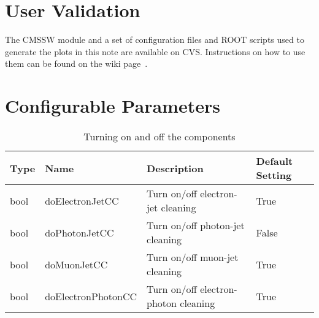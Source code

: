 \documentclass{cmspaper}
\begin{document}

\section{User Validation}
The CMSSW module and a set of configuration files and ROOT scripts used to
generate the plots in this note are available on CVS. Instructions on how to use
them can be found on the wiki page~\cite{twiki}.


\appendix
\section{Configurable Parameters}

\begin{table}[h]
\caption{Turning on and off the components}
\begin{center}
\begin{tabular}{l|l|l|l}
\textbf{Type} & \textbf{Name} & \textbf{Description} & \textbf{Default
    Setting} \\ \hline
    bool & doElectronJetCC   & Turn on/off electron-jet cleaning & True
    \\\hline
    bool & doPhotonJetCC     & Turn on/off photon-jet cleaning  & False
    \\\hline
    bool & doMuonJetCC       & Turn on/off muon-jet cleaning     & True
    \\\hline
    bool & doElectronPhotonCC& Turn on/off electron-photon cleaning & True
\end{tabular}
\end{center}
\label{tab:TurnOnModules}
\end{table}
\end{document}
